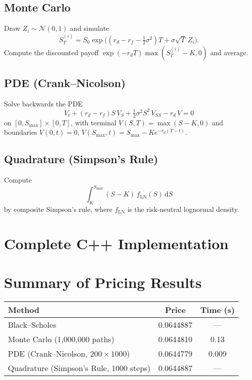 \documentclass[a4paper,11pt]{article}
\begin{document}
\subsection*{Monte Carlo}
Draw $Z_i\sim\mathcal N(0,1)$ and simulate
\[
  S_T^{(i)} = S_0 \exp\!\bigl((r_d - r_f - \tfrac12\sigma^2)T + \sigma\sqrt{T}\,Z_i\bigr).
\]
Compute the discounted payoff $\exp(-r_d T)\max(S_T^{(i)}-K,0)$ and average.

\subsection*{PDE (Crank–Nicolson)}
Solve backwards the PDE
\[
  V_t + (r_d - r_f)S\,V_S + \tfrac12\sigma^2 S^2\,V_{SS} - r_d\,V = 0
\]
on $[0,S_{\max}]\times[0,T]$, with terminal $V(S,T)=\max(S-K,0)$ and boundaries $V(0,t)=0$, $V(S_{\max},t)=S_{\max}-K e^{-r_d (T-t)}$.

\subsection*{Quadrature (Simpson’s Rule)}
Compute
\[
  \int_K^{S_{\max}} (S-K)\,f_{\mathrm{LN}}(S)\,\mathrm{d}S
\]
by composite Simpson’s rule, where $f_{\mathrm{LN}}$ is the risk-neutral lognormal density.

\section{Complete C++ Implementation}

\lstset{
  language=C++, basicstyle=\ttfamily\small, breaklines=true,
  keywordstyle=\bfseries, commentstyle=\itshape
}


\section{Summary of Pricing Results}

\begin{tabular}{@{}lcc@{}}
\toprule
Method                                   & Price     & Time (s) \\ 
\midrule
Black–Scholes                            & 0.0644887 & —        \\
Monte Carlo (1,000,000 paths)            & 0.0644810 & 0.13     \\
PDE (Crank–Nicolson, $200\times1000$)    & 0.0644779 & 0.009    \\
Quadrature (Simpson’s Rule, 1000 steps)  & 0.0644887 & —        \\
\bottomrule
\end{tabular}
\end{document}
